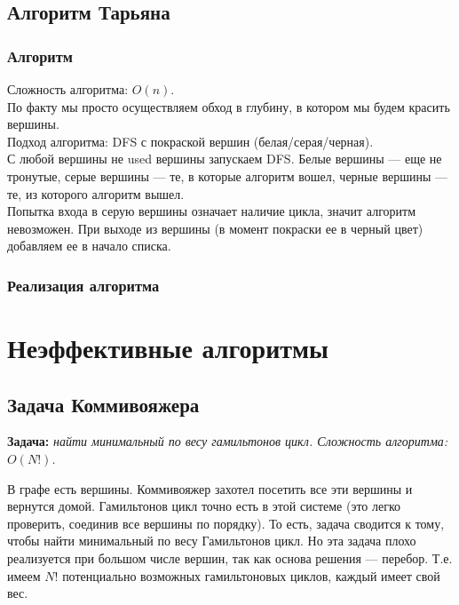 \subsection{Алгоритм Тарьяна}
\subsubsection{Алгоритм}
Сложность алгоритма: $O(n)$.\\
По факту мы просто осуществляем обход в глубину, в котором мы будем красить вершины.\\
\textsf{Подход алгоритма:} DFS с покраской вершин (белая/серая/черная).\\
С любой вершины не used вершины запускаем DFS. Белые вершины --- еще не тронутые, серые вершины --- те, в которые алгоритм вошел, черные вершины --- те, из которого алгоритм вышел.\\
Попытка входа в серую вершины означает наличие цикла, значит алгоритм невозможен.
При выходе из вершины (в момент покраски ее в черный цвет) добавляем ее в начало списка.

\subsubsection{Реализация алгоритма}
\section{Неэффективные алгоритмы}
\subsection{Задача Коммивояжера}
\textbf{Задача:} \emph{найти минимальный по весу гамильтонов цикл. Сложность алгоритма: $O(N!)$.}

В графе есть вершины. Коммивояжер захотел посетить  все эти вершины и вернутся домой. Гамильтонов цикл точно есть в этой системе (это легко проверить, соединив все вершины по порядку). То есть, задача сводится к тому, чтобы найти минимальный по весу Гамильтонов цикл. Но эта задача плохо реализуется при большом числе вершин, так как основа решения --- перебор. Т.е. имеем $N!$ потенциально возможных гамильтоновых циклов, каждый имеет свой вес.

